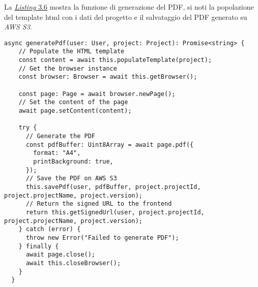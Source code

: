 \noindent La {\hyperref[lst:funzione-generazione-pdf]{\textit{Listing} 3.6}} mostra la funzione di generazione del PDF, si noti la popolazione del template \gls{html} con i dati del progetto e il salvataggio del PDF generato su \textit{AWS S3}.
\begin{lstlisting}[caption={Funzione di generazione del PDF, con salvataggio su \textit{AWS S3}}, label={lst:funzione-generazione-pdf}]
async generatePdf(user: User, project: Project): Promise<string> {
    // Populate the HTML template    
    const content = await this.populateTemplate(project);  
    // Get the browser instance
    const browser: Browser = await this.getBrowser(); 

    const page: Page = await browser.newPage();
    // Set the content of the page
    await page.setContent(content); 

    try {
      // Generate the PDF
      const pdfBuffer: Uint8Array = await page.pdf({
        format: "A4",
        printBackground: true,
      }); 
      // Save the PDF on AWS S3
      this.savePdf(user, pdfBuffer, project.projectId, project.projectName, project.version);  
      // Return the signed URL to the frontend
      return this.getSignedUrl(user, project.projectId, project.projectName, project.version);
    } catch (error) {
      throw new Error("Failed to generate PDF");
    } finally {
      await page.close();
      await this.closeBrowser();
    }
  }
\end{lstlisting}